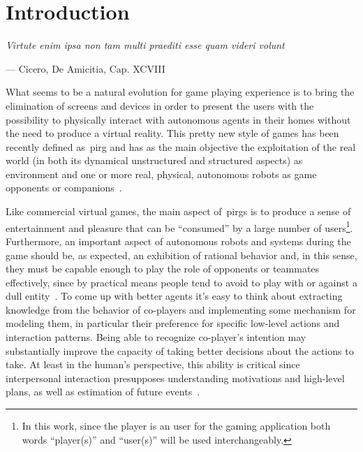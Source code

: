 \chapter{Introduction}
\epigraph{\itshape Virtute enim ipsa non tam multi praediti esse quam videri volunt}{--- Cicero, De Amicitia, Cap. XCVIII}

What seems to be a natural evolution for game playing experience is to bring the elimination of screens and devices in order to present the users with the possibility to physically interact with autonomous agents in their homes without the need to produce a virtual reality. This pretty new style of games has been recently defined as~\gls{pirg} and has as the main objective the exploitation of the real world (in both its dynamical unstructured and structured aspects) as environment and one or more real, physical, autonomous robots as game opponents or companions~\citep{martinoia_physically_2013}.

Like commercial virtual games, the main aspect of~\gls{pirg}s is to produce a sense of entertainment and pleasure that can be ``consumed'' by a large number of users\footnote{In this work, since the player is an user for the gaming application both words ``player(s)'' and ``user(s)'' will be used interchangeably.}. Furthermore, an important aspect of autonomous robots and systems during the game should be, as expected, an exhibition of rational behavior and, in this sense, they must be capable enough to play the role of opponents or teammates effectively, since by practical means people tend to avoid to play with or against a dull entity~\citep{martinoia_physically_2013}.
To come up with better agents it's easy to think about extracting knowledge from the behavior of co-players and implementing some mechanism for modeling them, in particular their preference for specific low-level actions and interaction patterns. Being able to recognize co-player's intention may substantially improve the capacity of taking better decisions about the actions to take.  At least in the human's perspective, this ability is critical since interpersonal interaction presupposes understanding  motivations and high-level plans, as well as estimation of future events~\citep{sukthankar_plan_2014}.

